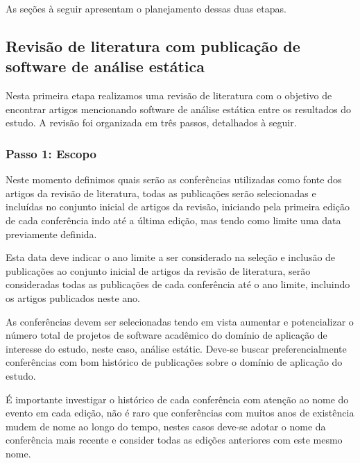 As seções à seguir apresentam o planejamento dessas duas etapas.

\subsection{Revisão de literatura com publicação de software de análise estática}

Nesta primeira etapa realizamos uma revisão de literatura com o objetivo de
encontrar artigos mencionando software de análise estática entre os resultados
do estudo. A revisão foi organizada em três passos, detalhados à seguir.


\subsubsection{Passo 1: Escopo}


Neste momento definimos quais serão as conferências utilizadas como fonte dos
artigos da revisão de literatura, todas as publicações serão selecionadas e
incluídas no conjunto inicial de artigos da revisão, iniciando pela primeira
edição de cada conferência indo até a última edição, mas tendo como limite uma
data previamente definida.

Esta data deve indicar o ano limite a ser considerado na seleção e inclusão de
publicações ao conjunto inicial de artigos da revisão de literatura, serão
consideradas todas as publicações de cada conferência até o ano limite,
incluindo os artigos publicados neste ano.

As conferências devem ser selecionadas tendo em vista aumentar e potencializar
o número total de projetos de software acadêmico do domínio de aplicação de
interesse do estudo, neste caso, análise estátic. Deve-se buscar
preferencialmente conferências com bom histórico de publicações sobre o domínio
de aplicação do estudo.

É importante investigar o histórico de cada conferência com atenção ao nome do
evento em cada edição, não é raro que conferências com muitos anos de
existência mudem de nome ao longo do tempo, nestes casos deve-se adotar o nome
da conferência mais recente e consider todas as edições anteriores com este
mesmo nome.

